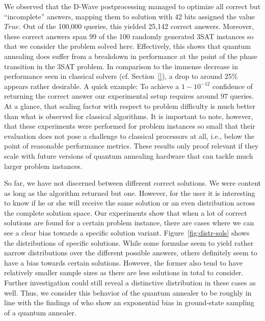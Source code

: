 We observed that the D-Wave postprocessing managed to optimize all correct but ``incomplete'' answers, mapping them to solution with 42 bits assigned the value $\textit{True}$. Out of the 100,000 queries, this yielded 25,142 correct answers. Moreover, these correct answers span 99 of the 100 randomly generated 3SAT instances so that we consider the problem solved here. Effectively, this shows that quantum annealing does suffer from a breakdown in performance at the point of the phase transition in the 3SAT problem. In comparison to the immense decrease in performance seen in classical solvers (cf. Section~\ref{}), a drop to around 25\% appears rather desirable. A quick example: To achieve a $1 - 10^{-12}$ confidence of returning the correct answer our experimental setup requires around $97$ queries. At a glance, that scaling factor with respect to problem difficulty is much better than what is observed for classical algorithms. It is important to note, however, that these experiments were performed for problem instances so small that their evaluation does not pose a challenge to classical processors at all, i.e., below the point of reasonable performance metrics. These results only proof relevant if they scale with future versions of quantum annealing hardware that can tackle much larger problem instances.

So far, we have not discerned between different correct solutions. We were content as long as the algorithm returned but one. However, for the user it is interesting to know if he or she will receive the same solution or an even distribution across the complete solution space. Our experiments show that when a lot of correct solutions are found for a certain problem instance, there are cases where we can see a clear bias towards a specific solution variant. Figure~\ref{fig:distr-sols} shows the distributions of specific solutions. While some formulae seem to yield rather narrow distributions over the different possible answers, others definitely seem to have a bias towards certain solutions. However, the former also tend to have relatively smaller sample sizes as there are less solutions in total to consider. Further investigation could still reveal a distinctive distribution in these cases as well. Thus, we consider this behavior of the quantum annealer to be roughly in line with the findings of \cite{mandra2017exponentially} who show an exponential bias in ground-state sampling of a quantum annealer.


